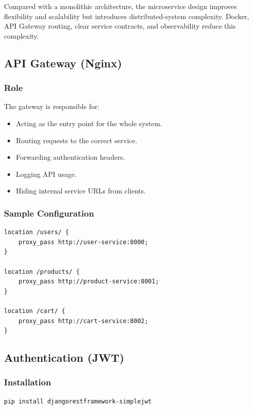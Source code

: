 \documentclass[12pt,a4paper]{article}
\begin{document}
Compared with a monolithic architecture, the microservice design improves flexibility and scalability but introduces distributed-system complexity. Docker, API Gateway routing, clear service contracts, and observability reduce this complexity.

\subsection{API Gateway (Nginx)}

\subsubsection{Role}

The gateway is responsible for:

\begin{itemize}
    \item Acting as the entry point for the whole system.
    \item Routing requests to the correct service.
    \item Forwarding authentication headers.
    \item Logging API usage.
    \item Hiding internal service URLs from clients.
\end{itemize}

\subsubsection{Sample Configuration}

\begin{lstlisting}[caption={Sample Nginx gateway routing.}]
location /users/ {
    proxy_pass http://user-service:8000;
}

location /products/ {
    proxy_pass http://product-service:8001;
}

location /cart/ {
    proxy_pass http://cart-service:8002;
}
\end{lstlisting}

\subsection{Authentication (JWT)}

\subsubsection{Installation}

\begin{lstlisting}[caption={JWT dependency.}]
pip install djangorestframework-simplejwt
\end{lstlisting}
\end{document}
